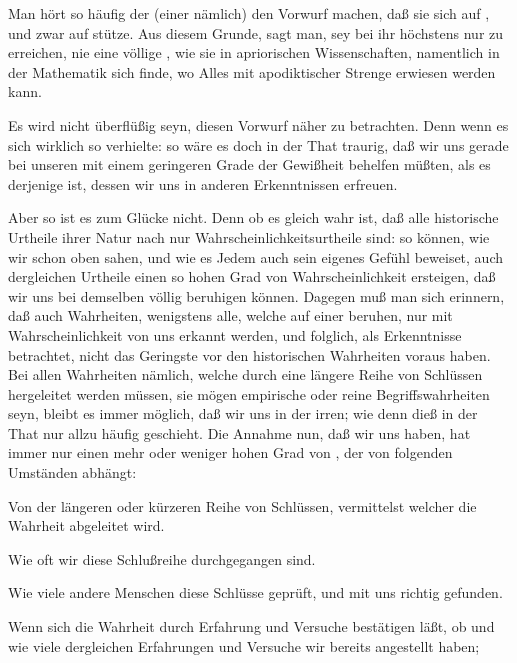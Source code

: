 \begin{aufza}
\item  Man hört so häufig der  (einer  nämlich) den Vorwurf machen, daß sie sich auf , und zwar auf  stütze. Aus diesem Grunde, sagt man, sey bei ihr höchstens nur  zu erreichen, nie eine völlige , wie sie in apriorischen Wissenschaften, namentlich in der Mathematik sich finde, wo Alles mit apodiktischer Strenge erwiesen werden kann.~
\item  Es wird nicht überflüßig seyn, diesen Vorwurf näher zu betrachten. Denn wenn es sich wirklich so verhielte: so wäre es doch in der That traurig, daß wir uns gerade bei unseren  mit einem geringeren Grade der Gewißheit behelfen müßten, als es derjenige ist, dessen wir uns in anderen Erkenntnissen erfreuen.
\item  Aber so ist es zum Glücke nicht. Denn ob es gleich wahr ist, daß alle historische Urtheile ihrer Natur nach nur Wahrscheinlichkeitsurtheile sind: so können, wie wir schon oben sahen, und wie es Jedem auch sein eigenes Gefühl beweiset, auch dergleichen Urtheile einen so hohen Grad von Wahrscheinlichkeit ersteigen, daß wir uns bei demselben völlig beruhigen können. Dagegen muß man sich erinnern, daß auch  Wahrheiten, wenigstens alle, welche auf einer  beruhen, nur mit Wahrscheinlichkeit von uns erkannt werden, und folglich, als Erkenntnisse betrachtet, nicht das Geringste vor den historischen Wahrheiten voraus haben. Bei allen Wahrheiten nämlich, welche durch eine längere Reihe von Schlüssen hergeleitet werden müssen, sie mögen empirische oder reine Begriffswahrheiten seyn, bleibt es immer möglich, daß wir uns in der  irren; wie denn dieß in der That nur allzu häufig geschieht. Die Annahme nun, daß wir uns  haben, hat immer nur einen mehr oder weniger hohen Grad von , der von folgenden Umständen abhängt:
\begin{aufzb}
\item  Von der längeren oder kürzeren Reihe von Schlüssen, vermittelst welcher die Wahrheit abgeleitet wird.
\item  Wie oft wir diese Schlußreihe durchgegangen sind.
\item  Wie viele andere Menschen diese Schlüsse geprüft, und mit uns richtig gefunden.
\item  Wenn sich die Wahrheit durch Erfahrung und Versuche bestätigen läßt, ob und wie viele dergleichen Erfahrungen und Versuche wir bereits angestellt haben; \usw

\end{aufzb}
\end{aufza}

